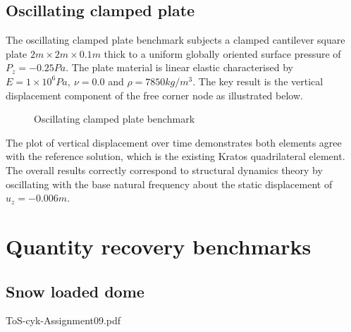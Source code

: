\subsection{Oscillating clamped plate}

The oscillating clamped plate benchmark subjects a clamped cantilever square plate $2m\times2m\times0.1m$ thick to a uniform globally oriented surface pressure of $P_z = -0.25 Pa$. The plate material is linear elastic characterised by $E = 1\times 10^6 Pa,\ \nu = 0.0$ and $\rho = 7850 kg/m^3$. The key result is the vertical displacement component of the free corner node as illustrated below.
 
\begin{figure}[H]
	\caption{\label{Oscillating clamped plate benchmark}Oscillating clamped plate benchmark}
\end{figure}

 The plot of vertical displacement over time demonstrates both elements agree with the reference solution, which is the existing Kratos quadrilateral element. The overall results correctly correspond to structural dynamics theory by oscillating with the base natural frequency about the static displacement of $u_z=-0.006m$.

\section{Quantity recovery benchmarks}


\subsection{Snow loaded dome}

ToS-cyk-Assignment09.pdf

